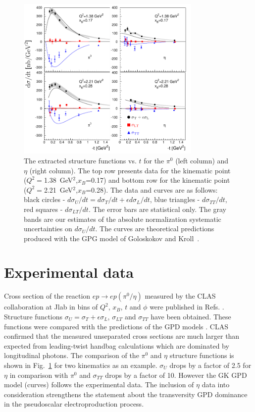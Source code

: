 \documentclass[prc,floatfix,superscriptaddress]{revtex4}
\begin{document}
\begin{figure}[t!]
\centering
\includegraphics[height=8cm] {fig16_scissored.pdf}
\caption
{The extracted structure functions vs. $t$ for 
the $\pi^0$ (left column) 
and $\eta$ (right column). The top row presents data for the kinematic point  ($Q^2=$1.38~GeV$^2$,$x_B$=0.17)
and bottom row for the kinematic point ($Q^2=$2.21~GeV$^2$,$x_B$=0.28). 
The data and curves are as follows:  
black circles - $d\sigma_U/dt =d\sigma_T/dt +\epsilon d\sigma_L/dt$,
blue triangles - $d\sigma_{TT}/dt$,
red  squares - $d\sigma_{LT}/dt$.
The error bars are statistical only. The gray bands are our estimates of the absolute normalization systematic uncertainties on $d\sigma_U/dt $.
The curves are theoretical predictions produced  with the GPG model of Goloskokov and Kroll~\cite{Goloskokov:2011rd}.
}
\label{fig:structure}
\end{figure} 



\section{Experimental data}
Cross section of the reaction $ep\rightarrow ep(\pi^0/\eta)$ measured by 
the CLAS collaboration at Jlab in bins of $Q^2$, $x_B$, $t$ and $\phi$ were published in 
 Refs.
 \cite{clas1,clas2,clas3}.
Structure functions $\sigma_U=\sigma_T+\epsilon\sigma_L$, $\sigma_{LT}$ and $\sigma_{TT}$ have been obtained. These functions were compared 
with the predictions of the GPD models \cite{Goloskokov:2011rd,GL}. CLAS confirmed that the measured unseparated cross sections are much larger than expected from 
leading-twist handbag calculations which are dominated by longitudinal photons. 
The comparison of the $\pi^0$ and $\eta$ structure functions is shown in Fig.~\ref{fig:structure} for two kinematics as an example. 
$\sigma_U$ drops by a factor of 2.5 for $\eta$ in comparison with $\pi^0$ and
$\sigma_{TT}$ drops by a factor of 10.
However the GK GPD model \cite{Goloskokov:2011rd}  (curves)  follows the experimental data.
The inclusion of $\eta$ data into consideration strengthens 
the statement about the transversity GPD dominance in the pseudoscalar electroproduction process.
\end{document}
